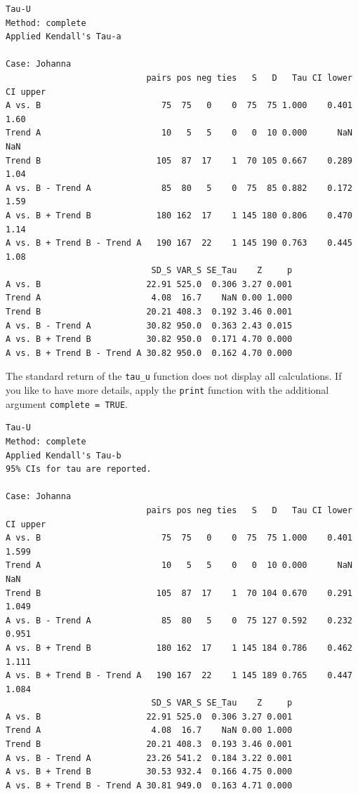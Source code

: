 \documentclass[
]{book}
\newenvironment{Shaded}{\begin{snugshade}}{\end{snugshade}}
\newcommand{\AttributeTok}[1]{\textcolor[rgb]{0.77,0.63,0.00}{#1}}
\newcommand{\ConstantTok}[1]{\textcolor[rgb]{0.00,0.00,0.00}{#1}}
\newcommand{\FunctionTok}[1]{\textcolor[rgb]{0.00,0.00,0.00}{#1}}
\newcommand{\NormalTok}[1]{#1}
\newcommand{\SpecialCharTok}[1]{\textcolor[rgb]{0.00,0.00,0.00}{#1}}
\begin{document}
\begin{verbatim}
Tau-U
Method: complete 
Applied Kendall's Tau-a

Case: Johanna 
                            pairs pos neg ties   S   D   Tau CI lower CI upper
A vs. B                        75  75   0    0  75  75 1.000    0.401     1.60
Trend A                        10   5   5    0   0  10 0.000      NaN      NaN
Trend B                       105  87  17    1  70 105 0.667    0.289     1.04
A vs. B - Trend A              85  80   5    0  75  85 0.882    0.172     1.59
A vs. B + Trend B             180 162  17    1 145 180 0.806    0.470     1.14
A vs. B + Trend B - Trend A   190 167  22    1 145 190 0.763    0.445     1.08
                             SD_S VAR_S SE_Tau    Z     p
A vs. B                     22.91 525.0  0.306 3.27 0.001
Trend A                      4.08  16.7    NaN 0.00 1.000
Trend B                     20.21 408.3  0.192 3.46 0.001
A vs. B - Trend A           30.82 950.0  0.363 2.43 0.015
A vs. B + Trend B           30.82 950.0  0.171 4.70 0.000
A vs. B + Trend B - Trend A 30.82 950.0  0.162 4.70 0.000
\end{verbatim}

The standard return of the \texttt{tau\_u} function does not display all calculations. If you like to have more details, apply the \texttt{print} function with the additional argument \texttt{complete\ =\ TRUE}.

\begin{Shaded}
\end{Shaded}

\begin{verbatim}
Tau-U
Method: complete 
Applied Kendall's Tau-b
95% CIs for tau are reported.

Case: Johanna 
                            pairs pos neg ties   S   D   Tau CI lower CI upper
A vs. B                        75  75   0    0  75  75 1.000    0.401    1.599
Trend A                        10   5   5    0   0  10 0.000      NaN      NaN
Trend B                       105  87  17    1  70 104 0.670    0.291    1.049
A vs. B - Trend A              85  80   5    0  75 127 0.592    0.232    0.951
A vs. B + Trend B             180 162  17    1 145 184 0.786    0.462    1.111
A vs. B + Trend B - Trend A   190 167  22    1 145 189 0.765    0.447    1.084
                             SD_S VAR_S SE_Tau    Z     p
A vs. B                     22.91 525.0  0.306 3.27 0.001
Trend A                      4.08  16.7    NaN 0.00 1.000
Trend B                     20.21 408.3  0.193 3.46 0.001
A vs. B - Trend A           23.26 541.2  0.184 3.22 0.001
A vs. B + Trend B           30.53 932.4  0.166 4.75 0.000
A vs. B + Trend B - Trend A 30.81 949.0  0.163 4.71 0.000
\end{verbatim}
\end{document}
